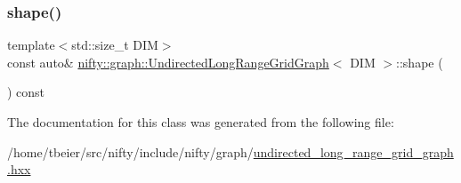 \mbox{\label{classnifty_1_1graph_1_1UndirectedLongRangeGridGraph_ac65c15cf1960267a284c8f7647386484}} 
\subsubsection{\texorpdfstring{shape()}{shape()}}
{\footnotesize\ttfamily template$<$std\+::size\+\_\+t D\+IM$>$ \\
const auto\& \hyperlink{classnifty_1_1graph_1_1UndirectedLongRangeGridGraph}{nifty\+::graph\+::\+Undirected\+Long\+Range\+Grid\+Graph}$<$ D\+IM $>$\+::shape (\begin{DoxyParamCaption}{ }\end{DoxyParamCaption}) const\hspace{0.3cm}{\ttfamily [inline]}}



The documentation for this class was generated from the following file\+:\begin{DoxyCompactItemize}
\item 
/home/tbeier/src/nifty/include/nifty/graph/\hyperlink{graph_2undirected__long__range__grid__graph_8hxx}{undirected\+\_\+long\+\_\+range\+\_\+grid\+\_\+graph.\+hxx}\end{DoxyCompactItemize}
